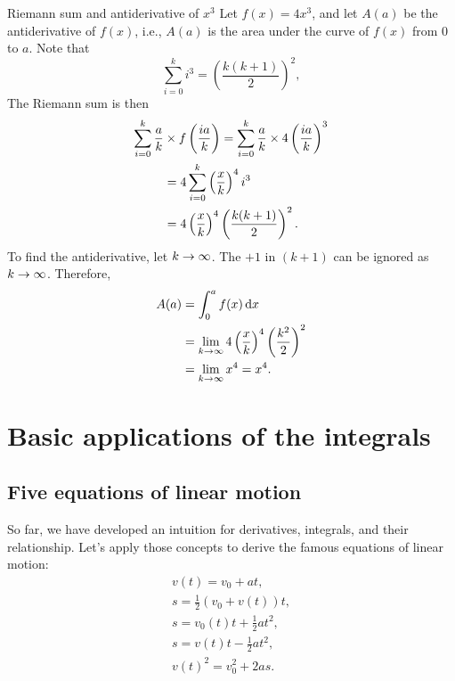 \begin{exmp}{Riemann sum and antiderivative of $x^3$}{}
    Let $f(x) = 4x^3$, and let $A(a)$ be the antiderivative of $f(x)$, i.e., $A(a)$ is the area under the curve of $f(x)$ from $0$ to $a$. Note that
    \begin{equation}
        \sum_{i = 0}^{k}i^3 = \left(\frac{k(k + 1)}{2}\right)^2,
    \end{equation}
    The Riemann sum is then
    \begin{align*}
        \sum_{i = 0}^{k}\frac{a}{k}&\times f\left( i a \over k \right) = \sum_{i = 0}^k\frac{a}{k}\times 4\left(ia\over k\right)^3 \\
        &= 4\sum_{i = 0}^k \left(\frac{x}{k}\right)^4 i^3 \\
        &= 4\left(\frac{x}{k}\right)^4\left(k(k+1)\over 2\right)^2.
    \end{align*}
    To find the antiderivative, let $k \rightarrow \infty$. The $+1$ in $(k + 1)$ can be ignored as $k \rightarrow \infty$. Therefore,
    \begin{align*}
        A(a) &= \int_0^a f(x)\dd{x} \\
        &= \lim_{k\rightarrow\infty}4\left(x\over k\right)^4\left(k^2\over 2\right)^2 \\
        &= \lim_{k\rightarrow\infty}x^4 = x^4.
    \end{align*}
\end{exmp}

\section{Basic applications of the integrals}

\subsection{Five equations of linear motion}
\label{sec:fiveequationsoflinearmotion}

So far, we have developed an intuition for derivatives, integrals, and their relationship. Let's apply those concepts to derive the famous equations of linear motion:
\begin{gather}
    v(t) = v_0 + at, \label{eq:linearmotion1}\\
    s = \frac{1}{2}(v_0 + v(t))t, \label{eq:linearmotion2}\\
    s = v_0(t)t + \frac{1}{2}at^2, \label{eq:linearmotion3}\\
    s = v(t)t - \frac{1}{2}at^2,\label{eq:linearmotion4}\\
    v(t)^2 = v_0^2 + 2as. \label{eq:linearmotion5}
\end{gather}

